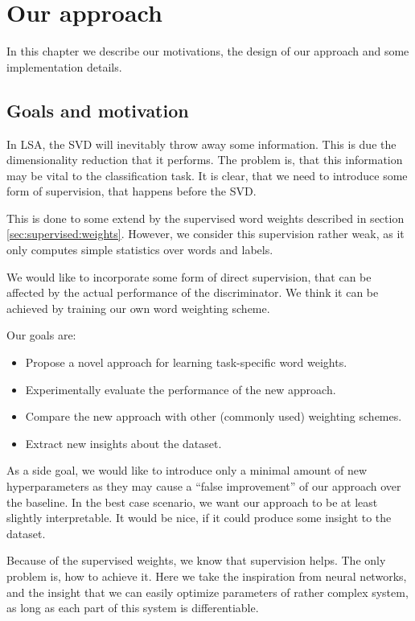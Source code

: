 \chapter{Our approach}

In this chapter we describe our motivations, the design of our approach and some implementation details.

\section{Goals and motivation}

    In LSA, the SVD will inevitably throw away some information. 
    This is due the dimensionality reduction that it performs.
    The problem is, that this information may be vital to the classification task. 
    It is clear, that we need to introduce some form of supervision, that happens before the SVD.
    
    This is done to some extend by the supervised word weights described in section \ref{sec:supervised:weights}. 
    However, we consider this supervision rather weak, as it only computes simple statistics over words and labels.
    
    We would like to incorporate some form of direct supervision, that can be affected by the actual performance of the discriminator.
    We think it can be achieved by training our own word weighting scheme. 
    
    Our goals are:
    \begin{itemize}
        \item Propose a novel approach for learning task-specific word weights.
        \item Experimentally evaluate the performance of the new approach.
        \item Compare the new approach with other (commonly used) weighting schemes. 
        \item Extract new insights about the dataset.
    \end{itemize}
    
    As a side goal, we would like to introduce only a minimal amount of new hyperparameters
    as they may cause a ``false improvement'' of our approach over the baseline.
    In the best case scenario, we want our approach to be at least slightly interpretable.
    It would be nice, if it could produce some insight to the dataset.
    
    Because of the supervised weights, we know that supervision helps. 
    The only problem is, how to achieve it. 
    Here we take the inspiration from neural networks, and the insight that we can easily optimize parameters of rather complex system, as long as each part of this system is differentiable. 

